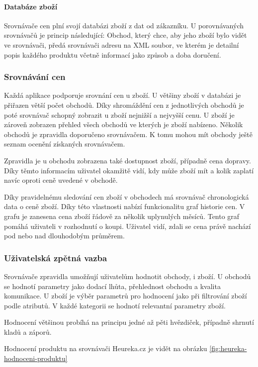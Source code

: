 \paragraph{Databáze zboží}
Srovnávače cen plní svojí databázi zboží z dat od zákazníku. U porovnávaných srovnávačů je princip následující: Obchod, který chce, aby jeho zboží bylo vidět ve srovnávači, předá srovnávači adresu na XML soubor, ve kterém je detailní popis každého produktu včetně informací jako způsob a doba doručení.\cite{website:heureka:registrace-obchodu}

\subsubsection{Srovnávání cen}
Každá aplikace podporuje srovnání cen u zboží. U většiny zboží v databázi je přiřazen větší počet obchodů. Díky shromáždění cen z jednotlivých obchodů je poté srovnávač schopný zobrazit u zboží nejnižší a nejvyšší cenu. U zboží je zároveň zobrazen přehled všech obchodů ve kterých je zboží nabízeno. Několik obchodů je zpravidla doporučeno srovnávačem. K tomu mohou mít obchody ještě seznam ocenění získaných srovnávačem.

Zpravidla je u obchodu zobrazena také dostupnost zboží, případně cena dopravy. Díky těmto informacím uživatel okamžitě vidí, kdy může zboží mít a kolik zaplatí navíc oproti ceně uvedené v obchodě.

Díky pravidelnému sledování cen zboží v obchodech má srovnávač chronologická data o ceně zboží. Díky této vlastnosti nabízí funkcionalitu graf historie cen. V grafu je zanesena cena zboží řádově za několik uplynulých měsíců. Tento graf pomáhá uživateli v rozhodnutí o koupi. Uživatel vidí, zdali se cena právě nachází pod nebo nad dlouhodobým průměrem.

\subsubsection{Uživatelská zpětná vazba}
Srovnávače zpravidla umožňují uživatelům hodnotit obchody, i zboží. U obchodů se hodnotí parametry jako dodací lhůta, přehlednost obchodu a kvalita komunikace. U zboží je výběr parametrů pro hodnocení jako při filtrování zboží podle atributů. V každé kategorii se hodnotí relevantní parametry zboží. 

Hodnocení většinou probíhá na principu jedné až pěti hvězdiček, případně shrnutí kladů a záporů.

Hodnocení produktu na srovnávači Heureka.cz je vidět na obrázku \ref{fig:heureka-hodnoceni-produktu}

